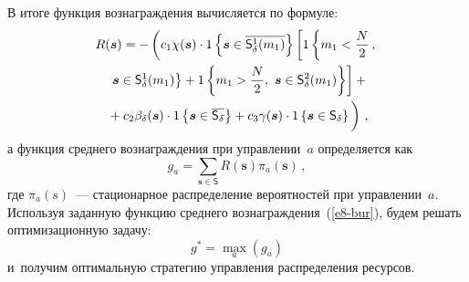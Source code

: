 \begin{multicols}{2}
  В итоге функция вознаграждения вычисляется по формуле:
  \begin{multline}
  R(\bm{s}) =-\left( c_1\chi(\bm{s}) \cdot {1}\left\{ \bm{s}\in 
\overline{\mathsf{S}_\delta^1(m_1)} \right\} \left[  1\left\{ m_1<\fr{N}{2}\,,\right.\right.\right.\hspace*{-2.6706pt}\\\ 
\left.\left.\bm{s}\in \mathsf{S}_\delta^1(m_1)\right\}+
1\left\{ m_1>\fr{N}{2},\ \bm{s}\in 
\mathsf{S}_\delta^2(m_1)\right\}\right] +{}\\
\left.{}+c_2\beta_\delta(\bm{s}) \cdot 1\left\{ 
\bm{s}\in \overline{\mathsf{S}_\delta}\right\} +c_3\gamma(\bm{s})\cdot 1\left\{ 
\bm{s}\in \mathsf{S}_\delta\right\}
\vphantom{\fr{N}{2}}
\right)\,,
  \label{e7-bur}
\end{multline}
а функция среднего вознаграждения при управлении~$a$ определяется как 
\begin{equation}
g_a= \sum\limits_{\bm{s}\in \mathsf{S}} R(\bm{s}) \pi_a(\bm{s})\,,
\label{e8-bur}
\end{equation}
где $\pi_a(s)$~--- стационарное распределение вероятностей при 
управлении~$a$. Используя заданную функцию среднего 
вознаграждения~(\ref{e8-bur}), будем решать оптимизационную 
задачу:
\begin{equation}
  g^*=\max\limits_a \left( g_a\right)
  \label{e9-bur}
  \end{equation}
и~получим оптимальную стратегию управления 
распределения ресурсов. 


\end{multicols}

